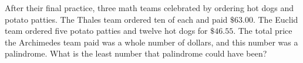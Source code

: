 After their final practice, three math teams celebrated by ordering hot dogs and potato patties. The Thales team ordered ten of each and paid $\$63.00$. The Euclid team ordered five potato patties and twelve hot dogs for $\$46.55$. The total price the Archimedes team paid was a whole number of dollars, and this number was a palindrome. What is the least number that palindrome could have been?
